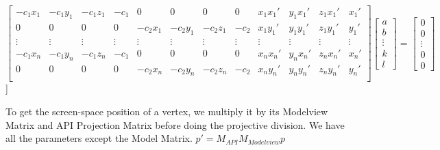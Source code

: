 \documentclass[conference]{IEEEtran}
\begin{document}
    \begin{equation} \label{eqn:DLT}
        \begin{bmatrix}
            -c_1 x_1 & -c_1 y_1 & -c_1 z_1 & -c_1   & 0        & 0        & 0        & 0      & x_1 x_{1}' & y_1 x_{1}' & z_1 x_{1}' & x_{1}' \\
            0        & 0        & 0        & 0      & -c_2 x_1 & -c_2 y_1 & -c_2 z_1 & -c_2   & x_1 y_{1}' & y_1 y_{1}' & z_1 y_{1}' & y_{1}' \\
            \vdots   & \vdots   & \vdots   & \vdots & \vdots   & \vdots   & \vdots   & \vdots & \vdots     & \vdots     & \vdots     & \vdots \\
            -c_1 x_n & -c_1 y_n & -c_1 z_n & -c_1   & 0        & 0        & 0        & 0      & x_n x_{n}' & y_n x_{n}' & z_n x_{n}' & x_{n}' \\
            0        & 0        & 0        & 0      & -c_2 x_n & -c_2 y_n & -c_2 z_n & -c_2   & x_n y_{n}' & y_n y_{n}' & z_n y_{n}' & y_{n}' \\
        \end{bmatrix}
        \begin{bmatrix}
            a      \\
            b      \\
            \vdots \\
            k      \\
            l
        \end{bmatrix}
        =
        \begin{bmatrix}
            0      \\
            0      \\
            \vdots \\
            0      \\
            0
        \end{bmatrix}
    \end{equation}
]

To get the screen-space position of a vertex, we multiply it by its Modelview Matrix and API Projection Matrix before doing the projective division.
We have all the parameters except the Model Matrix. $p' = M_{API} M_{Modelview} p$
\end{document}
